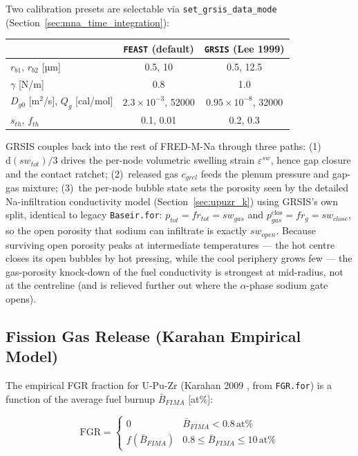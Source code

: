 \begin{refsection}
Two calibration presets are selectable via \texttt{set\_grsis\_data\_mode}
(Section~\ref{sec:mna_time_integration}):

\begin{center}
\begin{tabular}{lcc}
\toprule
 & \texttt{FEAST} (default) & \texttt{GRSIS} (Lee 1999) \\
\midrule
$r_{b1},\,r_{b2}$ [µm]      & 0.5, 10  & 0.5, 12.5 \\
$\gamma$ [N/m]               & 0.8      & 1.0 \\
$D_{g0}$ [m$^2$/s], $Q_g$ [cal/mol] & $2.3\times10^{-3}$, 52000 & $0.95\times10^{-8}$, 32000 \\
$s_{th},\,f_{th}$            & 0.1, 0.01 & 0.2, 0.3 \\
\bottomrule
\end{tabular}
\end{center}

GRSIS couples back into the rest of FRED-M-Na through three paths:
(1)~$\mathrm{d}(sw_{tot})/3$ drives the per-node volumetric swelling strain
$\varepsilon^{sw}$, hence gap closure and the contact ratchet;
(2)~released gas $c_{grel}$ feeds the plenum pressure and gap-gas mixture;
(3)~the per-node bubble state sets the porosity seen by the detailed
Na-infiltration conductivity model (Section~\ref{sec:upuzr_k}) using
GRSIS's own split, identical to legacy \texttt{Baseir.for}:
$p_{tot} = fr_{tot} = sw_{gas}$ and
$p^{\text{clos}}_{gas} = fr_g = sw_{close}$, so the open porosity that
sodium can infiltrate is exactly $sw_{open}$.  Because surviving open
porosity peaks at intermediate temperatures — the hot centre closes its
open bubbles by hot pressing, while the cool periphery grows few — the
gas-porosity knock-down of the fuel conductivity is strongest at
mid-radius, not at the centreline (and is relieved further out where the
$\alpha$-phase sodium gate opens).

\subsection{Fission Gas Release (Karahan Empirical Model)}
\label{sec:upuzr_fgr}

The empirical FGR fraction for U-Pu-Zr (Karahan 2009 \cite{karahan2009}, from \texttt{FGR.for}) is a function of the average fuel burnup $\bar{B}_{FIMA}$ [at\%]:

\begin{equation}
  \text{FGR} = \begin{cases}
    0                           & \bar{B}_{FIMA} < 0.8\,\text{at\%} \\
    f(\bar{B}_{FIMA})           & 0.8 \leq \bar{B}_{FIMA} \leq 10\,\text{at\%}
  \end{cases}
  \label{eq:fgr_metallic}
\end{equation}


\end{refsection}
